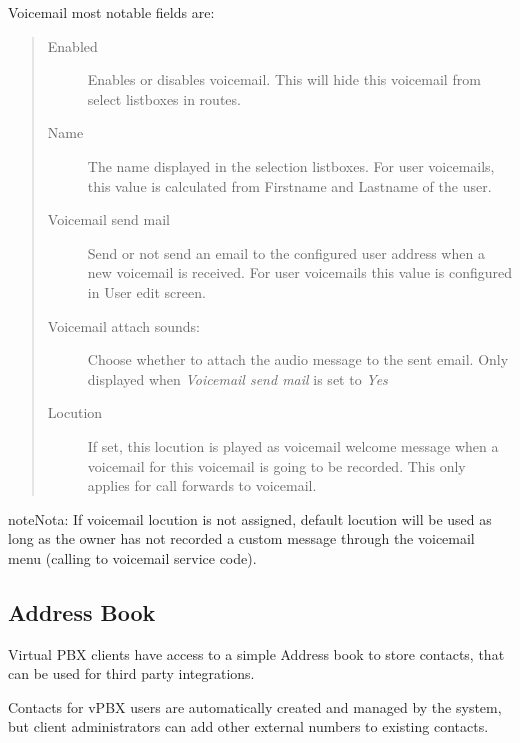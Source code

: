 \documentclass[letterpaper,10pt,spanish]{sphinxmanual}
\begin{document}
Voicemail most notable fields are:
\begin{quote}
\begin{description}
\item[{Enabled}] \leavevmode
Enables or disables voicemail. This will hide this voicemail from select listboxes in routes.

\item[{Name}] \leavevmode
The name displayed in the selection listboxes. For user voicemails, this value is calculated from Firstname and
Lastname of the user.

\item[{Voicemail send mail}] \leavevmode
Send or not send an email to the configured user address when a new voicemail is received. For user voicemails this value
is configured in User edit screen.

\item[{Voicemail attach sounds:}] \leavevmode
Choose whether to attach the audio message to the sent email. Only displayed when \emph{Voicemail send mail} is set to \emph{Yes}

\item[{Locution}] \leavevmode
If set, this locution is played as voicemail welcome message when a voicemail
for this voicemail is going to be recorded. This only applies for call forwards
to voicemail.

\end{description}
\end{quote}

\begin{notice}{note}{Nota:}
If voicemail locution is not assigned, default locution will be used as long as
the owner has not recorded a custom message through the voicemail menu (calling to
voicemail service code).
\end{notice}


\subsection{Address Book}
\label{administration_portal/client/vpbx/addressbook:address-book}\label{administration_portal/client/vpbx/addressbook::doc}
Virtual PBX clients have access to a simple Address book to store contacts,
that can be used for third party integrations.

Contacts for vPBX users are automatically created and managed by the system,
but client administrators can add other external numbers to existing contacts.
\end{document}
